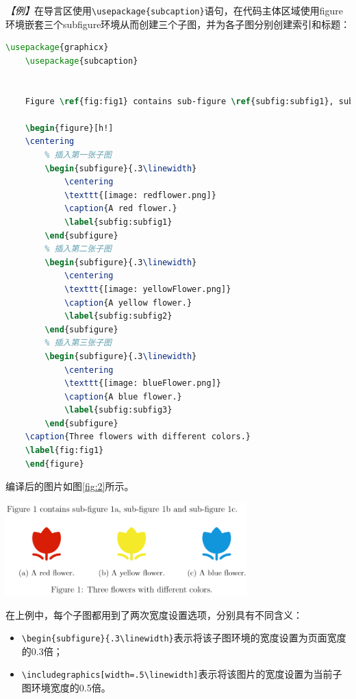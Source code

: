 \emph{【例】}在导言区使用\texttt{\textbackslash{}usepackage\{subcaption\}}语句，在代码主体区域使用figure环境嵌套三个subfigure环境从而创建三个子图，并为各子图分别创建索引和标题：
\begin{lstlisting}[language=TeX]
    \usepackage{graphicx}
    \usepackage{subcaption}
    

    Figure \ref{fig:fig1} contains sub-figure \ref{subfig:subfig1}, sub-figure \ref{subfig:subfig2} and sub-figure \ref{subfig:subfig3}.

    \begin{figure}[h!]
    \centering
        % 插入第一张子图
        \begin{subfigure}{.3\linewidth}
            \centering
            \texttt{[image: redflower.png]}
            \caption{A red flower.}
            \label{subfig:subfig1}
        \end{subfigure}
        % 插入第二张子图
        \begin{subfigure}{.3\linewidth}
            \centering
            \texttt{[image: yellowFlower.png]}
            \caption{A yellow flower.}
            \label{subfig:subfig2}
        \end{subfigure}
        % 插入第三张子图
        \begin{subfigure}{.3\linewidth}
            \centering
            \texttt{[image: blueFlower.png]}
            \caption{A blue flower.}
            \label{subfig:subfig3}
        \end{subfigure}
    \caption{Three flowers with different colors.}
    \label{fig:fig1}
    \end{figure}
\end{lstlisting}

编译后的图片如图\ref{fig:2}所示。

\begin{center}
    \includegraphics[width = 0.7\textwidth]{images/eg_9.png}
    \label{fig:2}
\end{center}

在上例中，每个子图都用到了两次宽度设置选项，分别具有不同含义：
\begin{itemize}
    \item \texttt{\textbackslash{}begin\{subfigure\}\{.3\textbackslash{}linewidth\}}表示将该子图环境的宽度设置为页面宽度的0.3倍；
    \item \texttt{\textbackslash{}includegraphics[width=.5\textbackslash{}linewidth]}表示将该图片的宽度设置为当前子图环境宽度的0.5倍。
\end{itemize}

